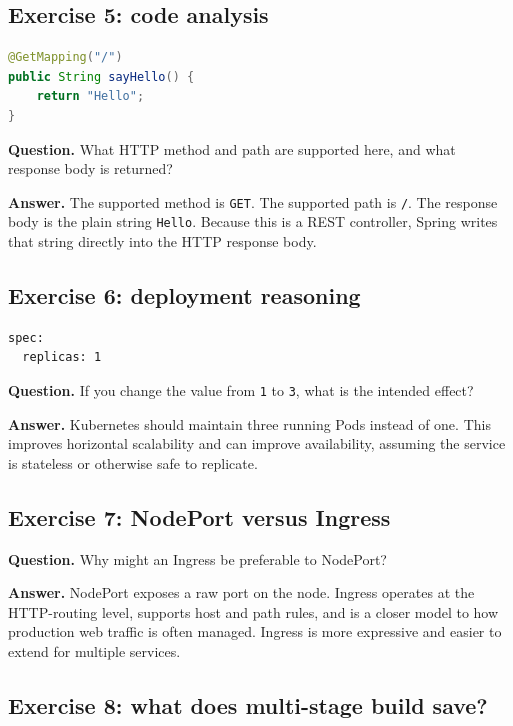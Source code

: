 \documentclass[a4paper,11pt]{article}
\begin{document}
\subsection*{Exercise 5: code analysis}

\begin{lstlisting}[style=code, language=Java]
@GetMapping("/")
public String sayHello() {
    return "Hello";
}
\end{lstlisting}

\textbf{Question.} What HTTP method and path are supported here, and what response body is returned?

\textbf{Answer.} The supported method is \texttt{GET}. The supported path is \texttt{/}. The response body is the plain string \texttt{Hello}. Because this is a REST controller, Spring writes that string directly into the HTTP response body.

\subsection*{Exercise 6: deployment reasoning}

\begin{lstlisting}[style=code]
spec:
  replicas: 1
\end{lstlisting}

\textbf{Question.} If you change the value from \texttt{1} to \texttt{3}, what is the intended effect?

\textbf{Answer.} Kubernetes should maintain three running Pods instead of one. This improves horizontal scalability and can improve availability, assuming the service is stateless or otherwise safe to replicate.

\subsection*{Exercise 7: NodePort versus Ingress}

\textbf{Question.} Why might an Ingress be preferable to NodePort?

\textbf{Answer.} NodePort exposes a raw port on the node. Ingress operates at the HTTP-routing level, supports host and path rules, and is a closer model to how production web traffic is often managed. Ingress is more expressive and easier to extend for multiple services.

\subsection*{Exercise 8: what does multi-stage build save?}
\end{document}
